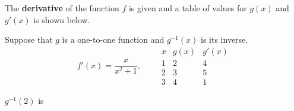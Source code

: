 \documentclass{ximera}
\author{Gregory Hartman \and Matthew Carr}
\begin{document}
\begin{exercise}



The \textbf{derivative} of the function $f$ is given and a table of values for $g(x)$ and $g'(x)$ is shown below.

Suppose that $g$ is a one-to-one function and $g^{-1}(x)$ is its inverse.
\[
f'(x)=\frac{x}{x^2+1},
\qquad
\begin{array}{c|c|c}
x & g(x) & g'(x)\\ \hline
1 & 2 & 4\\ \hline
2 & 3 & 5\\ \hline
3 & 4 & 1
\end{array}
\]

$g^{-1}(2)$ is
\begin{prompt}
\begin{multipleChoice}
\end{multipleChoice}
\end{prompt}

\end{exercise}
\end{document}
